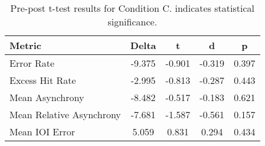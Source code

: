 
    \begin{table}[H]
    \centering
    \begin{small}
    \begin{tabular}{lcccc}
\toprule
Metric & Delta & t & d & p \\
\midrule
Error Rate & -9.375 & -0.901 & -0.319 & 0.397 \\
Excess Hit Rate & -2.995 & -0.813 & -0.287 & 0.443 \\
Mean Asynchrony & -8.482 & -0.517 & -0.183 & 0.621 \\
Mean Relative Asynchrony & -7.681 & -1.587 & -0.561 & 0.157 \\
Mean IOI Error & 5.059 & 0.831 & 0.294 & 0.434 \\
\bottomrule
\end{tabular}

    \end{small}
    \caption[Pre-post t-test results for Condition C]{Pre-post t-test results for Condition C. \newline * indicates statistical significance.}
    \label{tab:PrePost_C}
    \end{table}